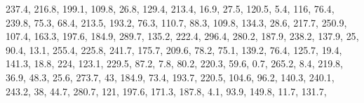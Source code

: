 \documentclass[]{book}
\newenvironment{Shaded}{\begin{snugshade}}{\end{snugshade}}
\newcommand{\DecValTok}[1]{\textcolor[rgb]{0.00,0.00,0.81}{#1}}
\newcommand{\FloatTok}[1]{\textcolor[rgb]{0.00,0.00,0.81}{#1}}
\newcommand{\NormalTok}[1]{#1}
\begin{document}
\begin{Shaded}
\begin{Highlighting}[]
    \FloatTok{237.4}\NormalTok{, }\FloatTok{216.8}\NormalTok{, }\FloatTok{199.1}\NormalTok{, }\FloatTok{109.8}\NormalTok{, }\FloatTok{26.8}\NormalTok{, }\FloatTok{129.4}\NormalTok{, }\FloatTok{213.4}\NormalTok{, }\FloatTok{16.9}\NormalTok{, }\FloatTok{27.5}\NormalTok{, }\FloatTok{120.5}\NormalTok{, }\FloatTok{5.4}\NormalTok{, }
    \DecValTok{116}\NormalTok{, }\FloatTok{76.4}\NormalTok{, }\FloatTok{239.8}\NormalTok{, }\FloatTok{75.3}\NormalTok{, }\FloatTok{68.4}\NormalTok{, }\FloatTok{213.5}\NormalTok{, }\FloatTok{193.2}\NormalTok{, }\FloatTok{76.3}\NormalTok{, }\FloatTok{110.7}\NormalTok{, }\FloatTok{88.3}\NormalTok{, }\FloatTok{109.8}\NormalTok{, }\FloatTok{134.3}\NormalTok{, }
    \FloatTok{28.6}\NormalTok{, }\FloatTok{217.7}\NormalTok{, }\FloatTok{250.9}\NormalTok{, }\FloatTok{107.4}\NormalTok{, }\FloatTok{163.3}\NormalTok{, }\FloatTok{197.6}\NormalTok{, }\FloatTok{184.9}\NormalTok{, }\FloatTok{289.7}\NormalTok{, }\FloatTok{135.2}\NormalTok{, }\FloatTok{222.4}\NormalTok{, }\FloatTok{296.4}\NormalTok{, }
    \FloatTok{280.2}\NormalTok{, }\FloatTok{187.9}\NormalTok{, }\FloatTok{238.2}\NormalTok{, }\FloatTok{137.9}\NormalTok{, }\DecValTok{25}\NormalTok{, }\FloatTok{90.4}\NormalTok{, }\FloatTok{13.1}\NormalTok{, }\FloatTok{255.4}\NormalTok{, }\FloatTok{225.8}\NormalTok{, }\FloatTok{241.7}\NormalTok{, }\FloatTok{175.7}\NormalTok{, }
    \FloatTok{209.6}\NormalTok{, }\FloatTok{78.2}\NormalTok{, }\FloatTok{75.1}\NormalTok{, }\FloatTok{139.2}\NormalTok{, }\FloatTok{76.4}\NormalTok{, }\FloatTok{125.7}\NormalTok{, }\FloatTok{19.4}\NormalTok{, }\FloatTok{141.3}\NormalTok{, }\FloatTok{18.8}\NormalTok{, }\DecValTok{224}\NormalTok{, }\FloatTok{123.1}\NormalTok{, }\FloatTok{229.5}\NormalTok{, }
    \FloatTok{87.2}\NormalTok{, }\FloatTok{7.8}\NormalTok{, }\FloatTok{80.2}\NormalTok{, }\FloatTok{220.3}\NormalTok{, }\FloatTok{59.6}\NormalTok{, }\FloatTok{0.7}\NormalTok{, }\FloatTok{265.2}\NormalTok{, }\FloatTok{8.4}\NormalTok{, }\FloatTok{219.8}\NormalTok{, }\FloatTok{36.9}\NormalTok{, }\FloatTok{48.3}\NormalTok{, }\FloatTok{25.6}\NormalTok{, }
    \FloatTok{273.7}\NormalTok{, }\DecValTok{43}\NormalTok{, }\FloatTok{184.9}\NormalTok{, }\FloatTok{73.4}\NormalTok{, }\FloatTok{193.7}\NormalTok{, }\FloatTok{220.5}\NormalTok{, }\FloatTok{104.6}\NormalTok{, }\FloatTok{96.2}\NormalTok{, }\FloatTok{140.3}\NormalTok{, }\FloatTok{240.1}\NormalTok{, }\FloatTok{243.2}\NormalTok{, }
    \DecValTok{38}\NormalTok{, }\FloatTok{44.7}\NormalTok{, }\FloatTok{280.7}\NormalTok{, }\DecValTok{121}\NormalTok{, }\FloatTok{197.6}\NormalTok{, }\FloatTok{171.3}\NormalTok{, }\FloatTok{187.8}\NormalTok{, }\FloatTok{4.1}\NormalTok{, }\FloatTok{93.9}\NormalTok{, }\FloatTok{149.8}\NormalTok{, }\FloatTok{11.7}\NormalTok{, }\FloatTok{131.7}\NormalTok{, }

\end{Highlighting}
\end{Shaded}
\end{document}
